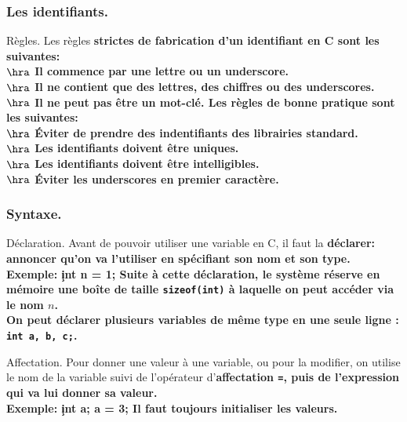 \documentclass[french, 11pt]{article}
\begin{document}
\vspace*{-0.7cm}

\subsubsection{Les identifiants.}

\begin{defi}{Règles.}{}
    Les règles \bf{strictes} de fabrication d'un identifiant en C sont les suivantes:\\
    $\hra$ Il commence par une lettre ou un underscore.\\
    $\hra$ Il ne contient que des lettres, des chiffres ou des underscores.\\
    $\hra$ Il ne peut pas être un mot-clé.\n
    Les règles de \bf{bonne pratique} sont les suivantes:\\
    $\hra$ Éviter de prendre des indentifiants des librairies standard.\\
    $\hra$ Les identifiants doivent être uniques.\\
    $\hra$ Les identifiants doivent être intelligibles.\\
    $\hra$ Éviter les underscores en premier caractère.
\end{defi}

\vspace*{-0.7cm}

\subsubsection{Syntaxe.}

\begin{defi}{Déclaration.}{}
    Avant de pouvoir utiliser une variable en C, il faut la \bf{déclarer}: annoncer qu'on va l'utiliser en spécifiant son nom et son type.\\
    \bf{Exemple:} \c{int n = 1;}\n
    Suite à cette déclaration, le système réserve en mémoire une boîte de taille \texttt{sizeof(int)} à laquelle on peut accéder via le nom $n$.\\
    On peut déclarer plusieurs variables de même type en une seule ligne : \texttt{int a, b, c;}.
\end{defi}

\vspace*{-0.7cm}

\begin{defi}{Affectation.}{}
    Pour donner une valeur à une variable, ou pour la modifier, on utilise le nom de la variable suivi de l'opérateur d'\bf{affectation} \texttt{=}, puis de l'expression qui va lui donner sa valeur.\\
    \bf{Exemple:} \c{int a; a = 3;}\n
    Il faut \bf{toujours} initialiser les valeurs.
\end{defi}
\end{document}
